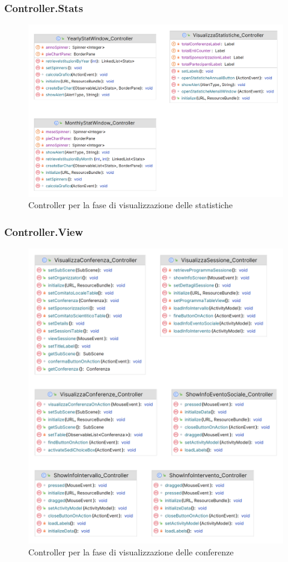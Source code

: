 \subsubsection{Controller.Stats}
\begin{figure}[h!]
	\includegraphics[scale=0.2]{Immagini/Controller_Statistiche.png}
	\caption{Controller per la fase di visualizzazione delle statistiche}
\end{figure}
\newpage
\subsubsection{Controller.View}
\begin{figure}[h!]
	\includegraphics[scale=0.17]{Immagini/Controller_Visualizzazione.png}
	\caption{Controller per la fase di visualizzazione delle conferenze}
\end{figure}
\newpage
